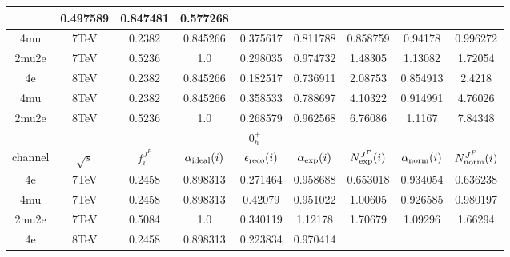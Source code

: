 \begin{table}[b]
\begin{tabular}{c c c c c c c c c}
 & 0.497589%
 & 0.847481 & 0.577268 \\ \hline 4mu & 7TeV & 0.2382 & 0.845266 & 0.375617 & 0.811788
 & 0.858759%
 & 0.94178 & 0.996272 \\ \hline 2mu2e & 7TeV & 0.5236 & 1.0  & 0.298035 & 0.974732
 & 1.48305%
 & 1.13082 & 1.72054 \\ \hline \hline 
4e & 8TeV & 0.2382 & 0.845266 & 0.182517 & 0.736911
 & 2.08753%
 & 0.854913 & 2.4218 \\ \hline 4mu & 8TeV & 0.2382 & 0.845266 & 0.358533 & 0.788697
 & 4.10322%
 & 0.914991 & 4.76026 \\ \hline 2mu2e & 8TeV & 0.5236 & 1.0  & 0.268579 & 0.962568
 & 6.76086%
 & 1.1167 & 7.84348 \\ \hline \hline 
 \multicolumn{9}{|c|}{$0^{+}_{h}$} \\ \hline 
channel & $\sqrt{s}$ & $f_{i}^{J^P}$ & $\alpha_{\rm ideal} (i)$ & $\epsilon_{\rm reco} (i)$ & $\alpha_{\rm exp} (i)$ & $N^{J^P}_{\rm exp} (i)$ & $\alpha_{\rm norm} (i)$ & $N^{J^P}_{\rm norm} (i)$\\ \hline 
4e & 7TeV & 0.2458 & 0.898313 & 0.271464 & 0.958688
 & 0.653018%
 & 0.934054 & 0.636238 \\ \hline 4mu & 7TeV & 0.2458 & 0.898313 & 0.42079 & 0.951022
 & 1.00605%
 & 0.926585 & 0.980197 \\ \hline 2mu2e & 7TeV & 0.5084 & 1.0  & 0.340119 & 1.12178
 & 1.70679%
 & 1.09296 & 1.66294 \\ \hline \hline 
4e & 8TeV & 0.2458 & 0.898313 & 0.223834 & 0.970414

\end{tabular}
\end{table}
